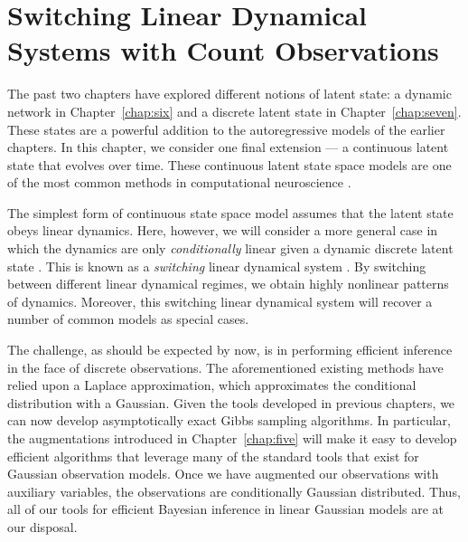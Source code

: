 \chapter{Switching Linear Dynamical Systems with Count Observations}
\label{chap:eight}

The past two chapters have explored different notions of latent
state: a dynamic network in Chapter~\ref{chap:six} and a discrete
latent state in Chapter~\ref{chap:seven}. These states are a powerful
addition to the autoregressive models of the earlier chapters. In
this chapter, we consider one final extension --- a continuous
latent state that evolves over time. These continuous latent state
space models are one of the most common methods in computational
neuroscience \citep{Smith-2003, paninski2010new, macke2011empirical,
  Buesing12, Petreska-2011, cunningham2014dimensionality}.

The simplest form of continuous state space model assumes that the
latent state obeys linear dynamics. Here, however, we will consider a
more general case in which the dynamics are only \emph{conditionally}
linear given a dynamic discrete latent state \citep{Petreska-2011}.
This is known as a \emph{switching} linear dynamical system
\citep{murphy2012probabilistic, fox2009bayesian}.  By switching
between different linear dynamical regimes, we obtain highly nonlinear
patterns of dynamics. Moreover, this switching linear dynamical system
will recover a number of common models as special cases.

The challenge, as should be expected by now, is in performing
efficient inference in the face of discrete observations. The
aforementioned existing methods have relied upon a Laplace
approximation, which approximates the conditional distribution with a
Gaussian.  Given the tools developed in previous chapters, we can now
develop asymptotically exact Gibbs sampling algorithms. In particular,
the \polyagamma augmentations introduced in Chapter~\ref{chap:five}
will make it easy to develop efficient algorithms that leverage many
of the standard tools that exist for Gaussian observation models. Once
we have augmented our observations with \polyagamma auxiliary
variables, the observations are conditionally Gaussian
distributed. Thus, all of our tools for efficient Bayesian inference
in linear Gaussian models are at our disposal.

